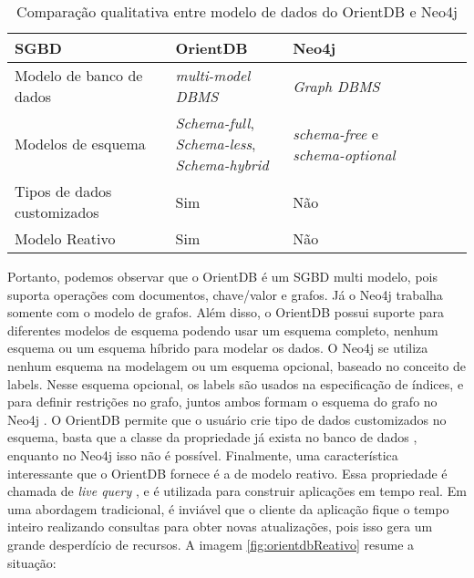 \begin{table}[h!]
\centering
\begin{tabular}{|l|l|l|l|l|}
\hline
SGBD                        & OrientDB                                                                        & Neo4j \\ \hline
Modelo de banco de dados    & \textit{multi-model DBMS}                                                       & \textit{Graph DBMS}  \\ \hline
Modelos de esquema          & \makecell{\textit{Schema-full},\\ \textit{Schema-less},\\ \textit{Schema-hybrid}} & \textit{schema-free} e \textit{schema-optional} \\ \hline
Tipos de dados customizados & Sim                                                                             & Não \\ \hline
Modelo Reativo              & Sim                                                                             & Não \\ \hline
\end{tabular}
\caption{Comparação qualitativa entre modelo de dados do OrientDB e Neo4j}
\label{table:1}
\end{table}

	Portanto, podemos observar que o OrientDB é um SGBD multi modelo, pois suporta operações com documentos, chave/valor e grafos. Já o Neo4j trabalha somente com o modelo de grafos. Além disso, o OrientDB possui suporte para diferentes modelos de esquema podendo usar um esquema completo, nenhum esquema ou um esquema híbrido para modelar os dados. O Neo4j se utiliza nenhum esquema na modelagem ou um esquema opcional, baseado no conceito de labels. Nesse esquema opcional, os labels são usados na especificação de índices, e para definir restrições no grafo, juntos ambos formam o esquema do grafo no Neo4j \cite{neo4jschemaoptional}. O OrientDB permite que o usuário crie tipo de dados customizados no esquema, basta que a classe da propriedade já exista no banco de dados \cite{orientdbcreateproperty}, enquanto no Neo4j isso não é possível. Finalmente, uma característica interessante que o OrientDB fornece é a de modelo reativo. Essa propriedade é chamada de \textit{live query} \cite{orientdblivequery}, e é utilizada para construir aplicações em tempo real. Em uma abordagem tradicional, é inviável que o cliente da aplicação fique o tempo inteiro realizando consultas para obter novas atualizações, pois isso gera um grande desperdício de recursos. A imagem \ref{fig:orientdbReativo} resume a situação:
	
